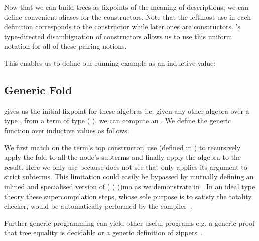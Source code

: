 Now that we can build trees as fixpoints of the
meaning of descriptions, we can define convenient aliases for
the  constructors.
%
Note that the leftmost \IdrisData{(\#)} use in each definition corresponds
to the  constructor while later ones are 
constructors.
%
\idris{}'s type-directed disambiguation of constructors allows us to use
this uniform notation for all of these pairing notions.

\noindent
\begin{minipage}[t]{.3\textwidth}
\end{minipage}\hfill
\begin{minipage}[t]{.65\textwidth}
\end{minipage}

This enables us to define our running example as an inductive value:


\subsection{Generic Fold}\label{sec:genericfoldinductive}

 gives us the initial fixpoint for these algebras i.e.
given any other algebra over a type , from a term of
type ( ), we can compute an .
%
We define the generic  function over inductive values
as follows:


We first match on the term's top constructor, use 
(defined in )
to recursively apply the fold to all the node's subterms and finally
apply the algebra to the result.
%
Here we only use \assertTotal{} because \idris{} does not see that
 only applies its argument to strict subterms.
This limitation could easily be bypassed by mutually defining
an inlined and specialised version of
( \IdrisKeyword{\KatlaUnderscore} ( ))ma
as we demonstrate in .
%
In an ideal type theory these supercompilation steps, whose sole
purpose is to satisfy the totality checker, would be automatically
performed by the compiler~\citep{MANUAL:phd/dublin/Mendel12}.


Further generic programming can yield other useful programs e.g. a
generic proof that tree equality is decidable or a generic definition
of zippers~\citep{DBLP:conf/icfp/LohM11}.
